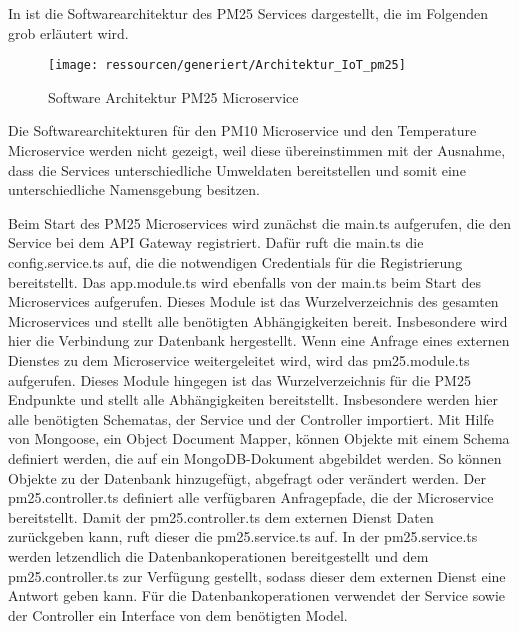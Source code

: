In  ist die Softwarearchitektur des PM25 Services dargestellt, die im Folgenden grob erläutert wird.
\begin{figure}[!htb]
	\centering
	\texttt{[image: ressourcen/generiert/Architektur\_IoT\_pm25]}
	\caption{Software Architektur PM25 Microservice}
	\label{fig:pm25archi}
\end{figure}
Die Softwarearchitekturen für den PM10 Microservice und den Temperature Microservice werden nicht gezeigt, weil diese übereinstimmen mit der Ausnahme, dass die Services unterschiedliche Umweldaten bereitstellen und somit eine unterschiedliche Namensgebung besitzen.


Beim Start des PM25 Microservices wird zunächst die main.ts aufgerufen, die den Service bei dem API Gateway registriert.
Dafür ruft die main.ts die config.service.ts auf, die die notwendigen Credentials für die Registrierung bereitstellt.
Das app.module.ts wird ebenfalls von der main.ts beim Start des Microservices aufgerufen.
Dieses Module ist das Wurzelverzeichnis des gesamten Microservices und stellt alle benötigten Abhängigkeiten bereit.
Insbesondere wird hier die Verbindung zur Datenbank hergestellt.
Wenn eine Anfrage eines externen Dienstes zu dem Microservice weitergeleitet wird, wird das pm25.module.ts aufgerufen.
Dieses Module hingegen ist das Wurzelverzeichnis für die PM25 Endpunkte und stellt alle Abhängigkeiten bereitstellt.
Insbesondere werden hier alle benötigten Schematas, der Service und der Controller importiert.
Mit Hilfe von Mongoose, ein Object Document Mapper, können Objekte mit einem Schema definiert werden, die auf ein MongoDB-Dokument abgebildet werden.
So können Objekte zu der Datenbank hinzugefügt, abgefragt oder verändert werden.
\cite{mongoose}Der pm25.controller.ts definiert alle verfügbaren Anfragepfade, die der Microservice bereitstellt.
Damit der pm25.controller.ts dem externen Dienst Daten zurückgeben kann, ruft dieser die pm25.service.ts auf.
In der pm25.service.ts werden letzendlich die Datenbankoperationen bereitgestellt und dem pm25.controller.ts zur Verfügung gestellt, sodass dieser dem externen Dienst eine Antwort geben kann.
Für die Datenbankoperationen verwendet der Service sowie der Controller ein Interface von dem benötigten Model.
\FloatBarrier

